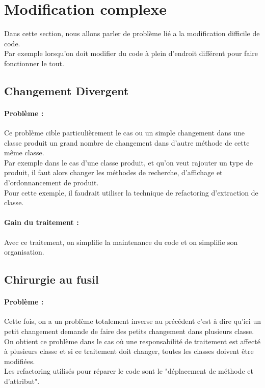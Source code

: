 \documentclass[a4paper,twoside,12pt,openright]{report}
\begin{document}
\section{Modification complexe}
Dans cette section, nous allons parler de problème lié a la modification difficile de code.\\
Par exemple lorsqu'on doit modifier du code à plein d'endroit différent pour faire fonctionner le tout.\\

\subsection{Changement Divergent}
\paragraph{Problème :}
Ce problème cible particulièrement le cas ou un simple changement dans une classe produit un grand nombre de changement dans d'autre méthode de cette même classe.\\
Par exemple dans le cas d'une classe produit, et qu'on veut rajouter un type de produit, il faut alors changer les méthodes de recherche, d'affichage et d'ordonnancement de produit.\\
Pour cette exemple, il faudrait utiliser la technique de refactoring d'extraction de classe.\\

\paragraph{Gain du traitement :}
Avec ce traitement, on simplifie la maintenance du code et on simplifie son organisation.\\

\subsection{Chirurgie au fusil}
\paragraph{Problème :}
Cette fois, on a un problème totalement inverse au précédent c'est à dire qu'ici un petit changement demande de faire des petits changement dans plusieurs classe.\\
On obtient ce problème dans le cas où une responsabilité de traitement est affecté à plusieurs classe et si ce traitement doit changer, toutes les classes doivent être modifiées.\\
Les refactoring utilisés pour réparer le code sont le "déplacement de méthode et d'attribut".\\
\end{document}
